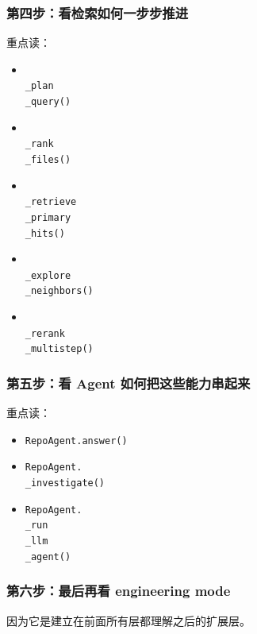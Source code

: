 \documentclass[UTF8,12pt,openany]{ctexbook}
\begin{document}
\subsubsection{第四步：看检索如何一步步推进}

重点读：\par

\begin{itemize}
\item \texttt{\\_plan\\_query()}
\item \texttt{\\_rank\\_files()}
\item \texttt{\\_retrieve\\_primary\\_hits()}
\item \texttt{\\_explore\\_neighbors()}
\item \texttt{\\_rerank\\_multistep()}
\end{itemize}

\subsubsection{第五步：看 Agent 如何把这些能力串起来}

重点读：\par

\begin{itemize}
\item \texttt{RepoAgent.answer()}
\item \texttt{RepoAgent.\\_investigate()}
\item \texttt{RepoAgent.\\_run\\_llm\\_agent()}
\end{itemize}

\subsubsection{第六步：最后再看 engineering mode}

因为它是建立在前面所有层都理解之后的扩展层。\par
\end{document}
